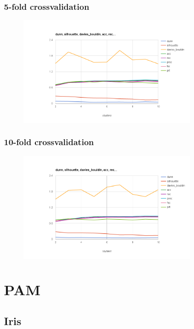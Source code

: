 \documentclass{article}
\begin{document}
\subsubsection{5-fold crossvalidation}
\begin{figure}[p]
    \centering
    \includegraphics[width=0.8\textwidth]{kmeans_ionosphere.arff_5}
\end{figure}
\subsubsection{10-fold crossvalidation}
\begin{figure}[p]
    \centering
    \includegraphics[width=0.8\textwidth]{kmeans_ionosphere.arff_10}
\end{figure}

\section{PAM}
\subsection{Iris}
\end{document}
